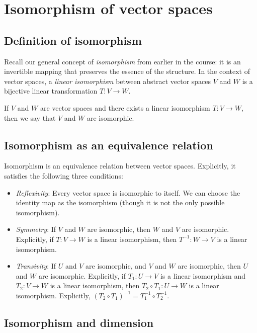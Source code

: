\documentclass[10pt]{amsart}
\begin{document}
\section{Isomorphism of vector spaces}

\subsection{Definition of isomorphism}

Recall our general concept of {\em isomorphism} from earlier in the
course: it is an invertible mapping that preserves the essence of the
structure. In the context of vector spaces, a {\em linear isomorphism}
between abstract vector spaces $V$ and $W$ is a bijective linear
transformation $T: V \to W$.

If $V$ and $W$ are vector spaces and there exists a linear isomorphism
$T: V \to W$, then we say that $V$ and $W$ are isomorphic.

\subsection{Isomorphism as an equivalence relation}

Isomorphism is an equivalence relation between vector
spaces. Explicitly, it satisfies the following three conditions:

\begin{itemize}
\item {\em Reflexivity}: Every vector space is isomorphic to
  itself. We can choose the identity map as the isomorphism (though it
  is not the only possible isomorphism).
\item {\em Symmetry}: If $V$ and $W$ are isomorphic, then $W$ and $V$
  are isomorphic. Explicitly, if $T:V \to W$ is a linear isomorphism,
  then $T^{-1}:W \to V$ is a linear isomorphism.
\item {\em Transivity}: If $U$ and $V$ are isomorphic, and $V$ and $W$
  are isomorphic, then $U$ and $W$ are isomorphic. Explicitly, if
  $T_1: U \to V$ is a linear isomorphism and $T_2:V \to W$ is a linear
  isomorphism, then $T_2 \circ T_1: U \to W$ is a linear
  isomorphism. Explicitly, $(T_2 \circ T_1)^{-1} = T_1^{-1} \circ
  T_2^{-1}$. 
\end{itemize}

\subsection{Isomorphism and dimension}
\end{document}
